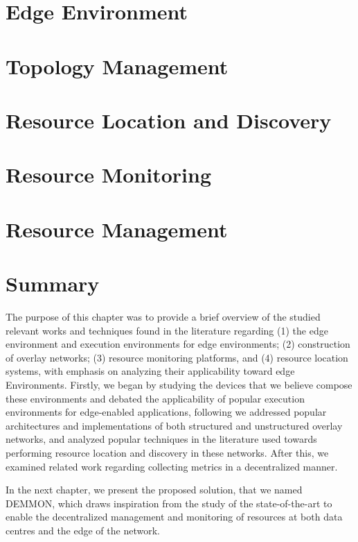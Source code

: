 \section{Edge Environment} \label{sec:edge_computing} 


\section{Topology Management} \label{sec:topology_management} 

\section{Resource Location and Discovery} \label{sec:res_location} 

\section{Resource Monitoring} \label{sec:res_monitoring} 

\section{Resource Management} \label{sec:res_management} 

\section{Summary}

The purpose of this chapter was to provide a brief overview of the studied relevant works and techniques found in the literature regarding (1) the edge environment and execution environments for edge environments; (2) construction of overlay networks; (3) resource monitoring platforms, and (4) resource location systems, with emphasis on analyzing their applicability toward edge Environments. Firstly, we began by studying the devices that we believe compose these environments and debated the applicability of popular execution environments for edge-enabled applications, following we addressed popular architectures and implementations of both structured and unstructured overlay networks, and analyzed popular techniques in the literature used towards performing resource location and discovery in these networks. After this, we examined related work regarding collecting metrics in a decentralized manner.

In the next chapter, we present the proposed solution, that we named DEMMON, which draws inspiration from the study of the state-of-the-art to enable the decentralized management and monitoring of resources at both data centres and the edge of the network.